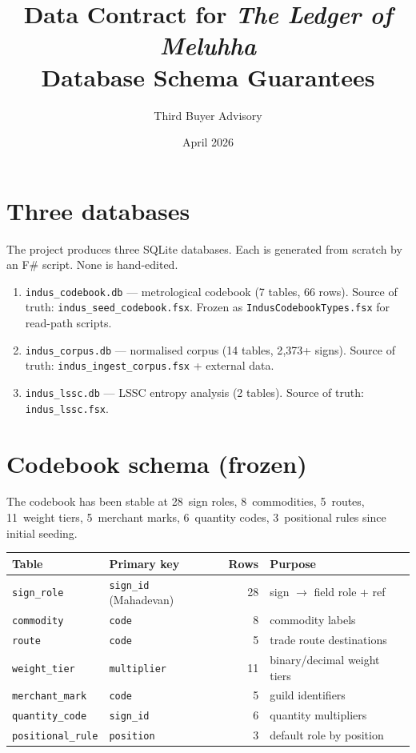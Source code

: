 \documentclass[11pt]{article}
\title{\textbf{Data Contract for \textit{The Ledger of Meluhha}}\\
  \large Database Schema Guarantees}
\author{Third Buyer Advisory}
\date{April 2026}
\begin{document}
\maketitle

\section{Three databases}

The project produces three SQLite databases. Each is generated
from scratch by an F\# script. None is hand-edited.

\begin{enumerate}[nosep]
\item \texttt{indus\_codebook.db} --- metrological codebook
  (7 tables, 66 rows). Source of truth:
  \texttt{indus\_seed\_codebook.fsx}.
  Frozen as \texttt{IndusCodebookTypes.fsx} for read-path
  scripts.
\item \texttt{indus\_corpus.db} --- normalised corpus
  (14 tables, 2{,}373+ signs). Source of truth:
  \texttt{indus\_ingest\_corpus.fsx} + external data.
\item \texttt{indus\_lssc.db} --- LSSC entropy analysis
  (2 tables). Source of truth: \texttt{indus\_lssc.fsx}.
\end{enumerate}

\section{Codebook schema (frozen)}

The codebook has been stable at 28~sign roles, 8~commodities,
5~routes, 11~weight tiers, 5~merchant marks, 6~quantity codes,
3~positional rules since initial seeding.

\begin{center}
\small
\begin{tabular}{@{}llrl@{}}
\toprule
\textbf{Table} & \textbf{Primary key} & \textbf{Rows} & \textbf{Purpose} \\
\midrule
\texttt{sign\_role} & \texttt{sign\_id} (Mahadevan) & 28 & sign $\to$ field role + ref \\
\texttt{commodity} & \texttt{code} & 8 & commodity labels \\
\texttt{route} & \texttt{code} & 5 & trade route destinations \\
\texttt{weight\_tier} & \texttt{multiplier} & 11 & binary/decimal weight tiers \\
\texttt{merchant\_mark} & \texttt{code} & 5 & guild identifiers \\
\texttt{quantity\_code} & \texttt{sign\_id} & 6 & quantity multipliers \\
\texttt{positional\_rule} & \texttt{position} & 3 & default role by position \\
\bottomrule
\end{tabular}
\end{center}
\end{document}
